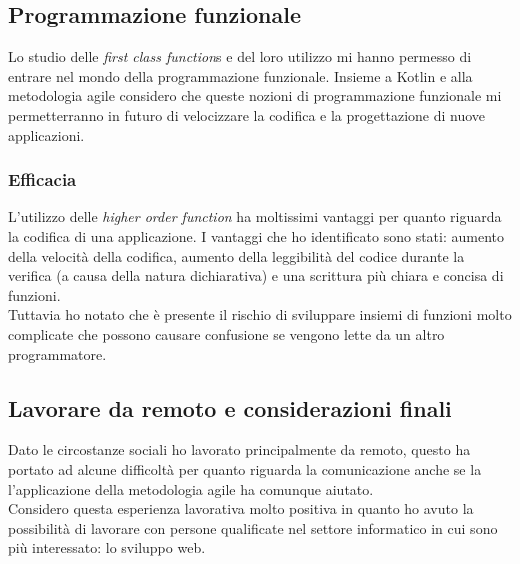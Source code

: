 \subsection{Programmazione funzionale}
Lo studio delle \emph{first class function}s e del loro utilizzo mi hanno permesso di entrare nel mondo della programmazione funzionale. Insieme a Kotlin e alla metodologia agile considero che queste nozioni di programmazione funzionale mi permetterranno in futuro di velocizzare la codifica e la progettazione di nuove applicazioni.

\subsubsection*{Efficacia}
L'utilizzo delle \emph{higher order function} ha moltissimi vantaggi per quanto riguarda la codifica di una applicazione. I vantaggi che ho identificato sono stati: aumento della velocità della codifica, aumento della leggibilità del codice durante la verifica (a causa della natura dichiarativa) e una scrittura più chiara e concisa di funzioni. \\
Tuttavia ho notato che è presente il rischio di sviluppare insiemi di funzioni molto complicate che possono causare confusione se vengono lette da un altro programmatore.

\subsection{Lavorare da remoto e considerazioni finali}
Dato le circostanze sociali ho lavorato principalmente da remoto, questo ha portato ad alcune difficoltà per quanto riguarda la comunicazione anche se la l'applicazione della metodologia agile ha comunque aiutato. \\ 
Considero questa esperienza lavorativa molto positiva in quanto ho avuto la possibilità di lavorare con persone qualificate nel settore informatico in cui sono più interessato: lo sviluppo web. 
